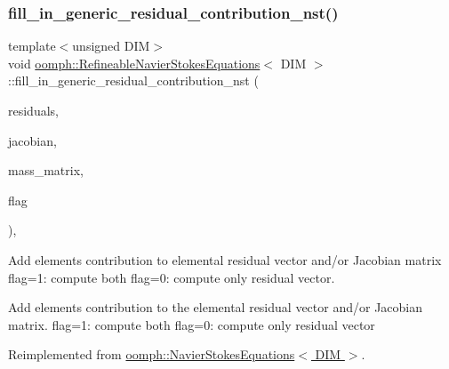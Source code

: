 \mbox{\label{classoomph_1_1RefineableNavierStokesEquations_a63a9aff288190f8d2abb0e985c08c1f0}} 
\subsubsection{\texorpdfstring{fill\+\_\+in\+\_\+generic\+\_\+residual\+\_\+contribution\+\_\+nst()}{fill\_in\_generic\_residual\_contribution\_nst()}}
{\footnotesize\ttfamily template$<$unsigned D\+IM$>$ \\
void \hyperlink{classoomph_1_1RefineableNavierStokesEquations}{oomph\+::\+Refineable\+Navier\+Stokes\+Equations}$<$ D\+IM $>$\+::fill\+\_\+in\+\_\+generic\+\_\+residual\+\_\+contribution\+\_\+nst (\begin{DoxyParamCaption}\item[{\hyperlink{classoomph_1_1Vector}{Vector}$<$ double $>$ \&}]{residuals,  }\item[{\hyperlink{classoomph_1_1DenseMatrix}{Dense\+Matrix}$<$ double $>$ \&}]{jacobian,  }\item[{\hyperlink{classoomph_1_1DenseMatrix}{Dense\+Matrix}$<$ double $>$ \&}]{mass\+\_\+matrix,  }\item[{unsigned}]{flag }\end{DoxyParamCaption})\hspace{0.3cm}{\ttfamily [protected]}, {\ttfamily [virtual]}}



Add element\textquotesingle{}s contribution to elemental residual vector and/or Jacobian matrix flag=1\+: compute both flag=0\+: compute only residual vector. 

Add element\textquotesingle{}s contribution to the elemental residual vector and/or Jacobian matrix. flag=1\+: compute both flag=0\+: compute only residual vector 

Reimplemented from \hyperlink{classoomph_1_1NavierStokesEquations_acaa521c31b070b81f424e4eec4fed579}{oomph\+::\+Navier\+Stokes\+Equations$<$ D\+I\+M $>$}.



